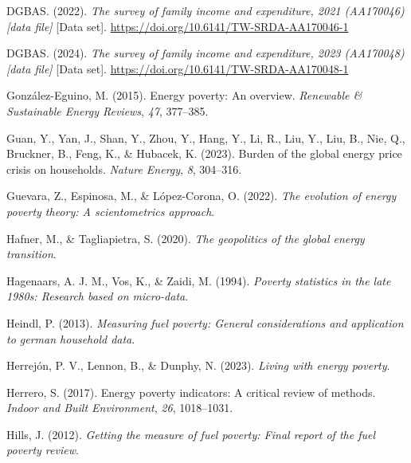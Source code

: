 \documentclass[
  twoside,
  openright,
  degree    = master,               %
  language  = english,              %
  fontset   = overleaf,             %
  watermark = true,                 %
  doi       = true,                 %
]{ntuthesis}
\newlength{\cslhangindent}
\newlength{\cslentryspacingunit} %
\newenvironment{CSLReferences}[2] %
 {%
  \setlength{\parindent}{0pt}
  \ifodd #1
  \let\oldpar\par
  \def\par{\hangindent=\cslhangindent\oldpar}
  \fi
  \setlength{\parskip}{#2\cslentryspacingunit}
 }%
 {}
\begin{document}
\begin{CSLReferences}{1}{0}
\leavevmode{}%
DGBAS. (2022). \emph{The survey of family income and expenditure, 2021
(AA170046) {[}data file{]}} {[}Data set{]}.
\url{https://doi.org/10.6141/TW-SRDA-AA170046-1}

\leavevmode{}%
DGBAS. (2024). \emph{The survey of family income and expenditure, 2023
(AA170048) {[}data file{]}} {[}Data set{]}.
\url{https://doi.org/10.6141/TW-SRDA-AA170048-1}

\leavevmode{}%
González-Eguino, M. (2015). Energy poverty: An overview. \emph{Renewable
\& Sustainable Energy Reviews}, \emph{47}, 377--385.

\leavevmode{}%
Guan, Y., Yan, J., Shan, Y., Zhou, Y., Hang, Y., Li, R., Liu, Y., Liu,
B., Nie, Q., Bruckner, B., Feng, K., \& Hubacek, K. (2023). Burden of
the global energy price crisis on households. \emph{Nature Energy},
\emph{8}, 304--316.

\leavevmode{}%
Guevara, Z., Espinosa, M., \& López-Corona, O. (2022). \emph{The
evolution of energy poverty theory: A scientometrics approach}.

\leavevmode{}%
Hafner, M., \& Tagliapietra, S. (2020). \emph{The geopolitics of the
global energy transition}.

\leavevmode{}%
Hagenaars, A. J. M., Vos, K., \& Zaidi, M. (1994). \emph{Poverty
statistics in the late 1980s: Research based on micro-data}.

\leavevmode{}%
Heindl, P. (2013). \emph{Measuring fuel poverty: General considerations
and application to german household data}.

\leavevmode{}%
Herrejón, P. V., Lennon, B., \& Dunphy, N. (2023). \emph{Living with
energy poverty}.

\leavevmode{}%
Herrero, S. (2017). Energy poverty indicators: A critical review of
methods. \emph{Indoor and Built Environment}, \emph{26}, 1018--1031.

\leavevmode{}%
Hills, J. (2012). \emph{Getting the measure of fuel poverty: Final
report of the fuel poverty review}.


\end{CSLReferences}
\end{document}
